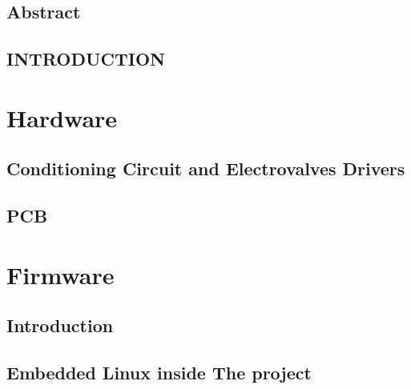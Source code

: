 \documentclass[a4paper,12pt,openany,twoside, abstracton]{book}%
\begin{document}
 \selectfont


\newpage
{}


\linespread{1.5}
\chapter*{Abstract}



\cleardoublepage
\tableofcontents
\cleardoublepage
{}

\chapter*{INTRODUCTION}\label{summary}

\cleardoublepage
\part{Hardware}\label{HW}

\newpage

\chapter{Conditioning Circuit and Electrovalves Drivers}\label{ch:Analog}


\chapter{PCB}\label{cha:PCB}


\part{Firmware}
\chapter{Introduction}\label{ch:IIintroduction}


\chapter{Embedded Linux inside The project}\label{ch:firmware}

\end{document}
